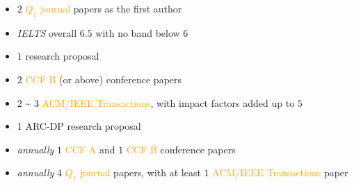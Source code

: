 \documentclass{tikzposter} %
\begin{document}
\begin{columns}
{\begin{minipage}[l]{0.45\linewidth}
\begin{description}[font=\small]
\begin{description}[font=\small]
						\begin{itemize}
							\footnotesize \item $2$ \textcolor{orange}{$Q_1$ journal} papers as the first author
							\item \textit{IELTS} overall $6.5$ with no band below $6$
						\end{itemize}
					\end{description}
					\item[PhD Students] \hfill
					\begin{itemize}
						\footnotesize \item $1$ research proposal
						\item $2$ \textcolor{orange}{CCF B} (or above) conference papers
						\item $2$ \textasciitilde{} $3$ \textcolor{orange}{ACM/IEEE Transactions},
						with impact factors added up to $5$
					\end{itemize}
					\item[Post-doctoral Research Fellows] \hfill
					\begin{itemize}
						\footnotesize \item 1 ARC-DP research proposal
						\item \textit{annually} $1$ \textcolor{orange}{CCF A} and $1$ \textcolor{orange}{CCF B} conference papers
						\item \textit{annually} $4$ \textcolor{orange}{$Q_1$ journal} papers,
						with at least $1$ \textcolor{orange}{ACM/IEEE Transactions} paper
						
					\end{itemize}
					
				\end{description}		
			\end{minipage}
			
		\vfill
		\vspace{1cm}
		\begin{minipage}{\linewidth}
			\centering
			\scalebox{1}{
				
}
\end{minipage}}
\end{columns}
\end{document}
